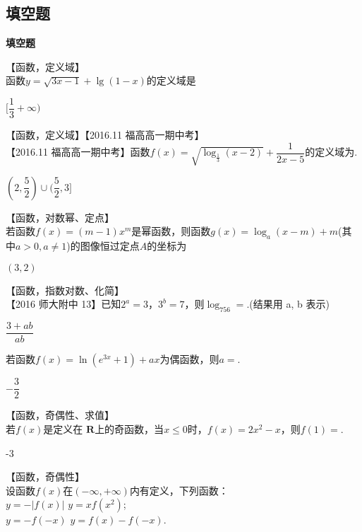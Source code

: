   \subsection{填空题}
  \begin{exercise}{\bf 填空题}
    \item 【函数，定义域】\\
       函数$y=\sqrt{3x-1}+\lg(1-x)$的定义域是\tk
      \begin{answer}
        $[\dfrac13 +\infty)$
      \end{answer}
    \item 【函数，定义域】【2016.11 福高高一期中考】\\
      【2016.11 福高高一期中考】函数$f(x)=\sqrt{\log_{\frac13}(x-2)}+\dfrac1{2x-5}$的定义域为\tk.
      \begin{answer}
        $(2,\dfrac52)\cup(\dfrac52,3] $
      \end{answer}
    \item 【函数，对数幂、定点】\\
       若函数$f(x)=(m-1)x^m$是幂函数，则函数$g(x)=\log_a(x-m)+m$(其中$a>0,a\neq 1$)的图像恒过定点$A$的坐标为\tk
       \begin{answer}
         $(3,2)$
       \end{answer}
    \item 【函数，指数对数、化简】\\
      【2016 师大附中 13】已知$2^a=3 $，$3^b=7$，则$\log_756= $\tk.(结果用 a, b 表示)
      \begin{answer}
        $\dfrac{3+ab}{ab}$
      \end{answer}\item
        若函数$f(x)=\ln (e^{3x}+1)+ax$为偶函数，则$ a= $\tk.
        \begin{answer}
          $-\dfrac{3}2$
        \end{answer}
    \item【函数，奇偶性、求值】\\
      若$f(x)$是定义在 $\mathbf{R} $上的奇函数，当$ x\le0 $时，$f(x)=2x^2-x$，则$f(1)=$\tk.
      \begin{answer}
        -3
      \end{answer}
    \item【函数，奇偶性】\\
      设函数$f(x)$在$ \left(-\infty,+\infty\right) $内有定义，下列函数：\\
       $ y=-\left|f(x)\right| $\qquad{} $ y=xf(x^2) $;\\
       $ y=-f(-x) $\qquad {} $ y=f(x)-f(-x) $.\\

\end{exercise}
